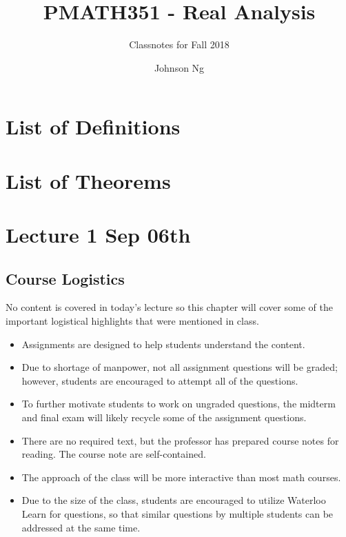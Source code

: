 \documentclass[notoc,notitlepage]{tufte-book}
\title{PMATH351 - Real Analysis}
\author{Johnson Ng}
\subtitle{Classnotes for Fall 2018}
\begin{document}
\hypersetup{pageanchor=false}
\maketitle
\hypersetup{pageanchor=true}
\tableofcontents

\chapter*{\faBook \enspace List of Definitions}

\chapter*{\faCoffee \enspace List of Theorems}

\nocite{bforres2018}

\chapter{Lecture 1 Sep 06th}%
\label{chp:lecture_1_sep_06th}

\section{Course Logistics}%
\label{sec:course_logistics}

No content is covered in today's lecture so this chapter will cover some of the important logistical highlights that were mentioned in class.

\begin{itemize}
  \item Assignments are designed to help students understand the content.
  \item Due to shortage of manpower, not all assignment questions will be graded; however, students are encouraged to attempt all of the questions.
  \item To further motivate students to work on ungraded questions, the midterm and final exam will likely recycle some of the assignment questions.
  \item There are no required text, but the professor has prepared course notes for reading. The course note are self-contained.
  \item The approach of the class will be more interactive than most math courses.
  \item Due to the size of the class, students are encouraged to utilize Waterloo Learn for questions, so that similar questions by multiple students can be addressed at the same time.
\end{itemize}
\end{document}
